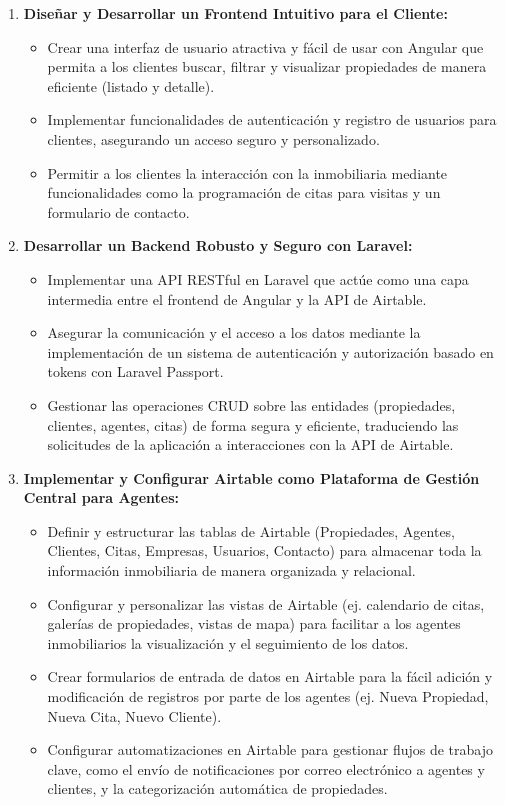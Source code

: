 \begin{enumerate}
    \item \textbf{Diseñar y Desarrollar un Frontend Intuitivo para el Cliente:}
    \begin{itemize}
        \item Crear una interfaz de usuario atractiva y fácil de usar con Angular que permita a los clientes buscar, filtrar y visualizar propiedades de manera eficiente (listado y detalle).
        \item Implementar funcionalidades de autenticación y registro de usuarios para clientes, asegurando un acceso seguro y personalizado.
        \item Permitir a los clientes la interacción con la inmobiliaria mediante funcionalidades como la programación de citas para visitas y un formulario de contacto.
    \end{itemize}

    \item \textbf{Desarrollar un Backend Robusto y Seguro con Laravel:}
    \begin{itemize}
        \item Implementar una API RESTful en Laravel que actúe como una capa intermedia entre el frontend de Angular y la API de Airtable.
        \item Asegurar la comunicación y el acceso a los datos mediante la implementación de un sistema de autenticación y autorización basado en tokens con Laravel Passport.
        \item Gestionar las operaciones CRUD sobre las entidades (propiedades, clientes, agentes, citas) de forma segura y eficiente, traduciendo las solicitudes de la aplicación a interacciones con la API de Airtable.
    \end{itemize}

    \item \textbf{Implementar y Configurar Airtable como Plataforma de Gestión Central para Agentes:}
    \begin{itemize}
        \item Definir y estructurar las tablas de Airtable (Propiedades, Agentes, Clientes, Citas, Empresas, Usuarios, Contacto) para almacenar toda la información inmobiliaria de manera organizada y relacional.
        \item Configurar y personalizar las vistas de Airtable (ej. calendario de citas, galerías de propiedades, vistas de mapa) para facilitar a los agentes inmobiliarios la visualización y el seguimiento de los datos.
        \item Crear formularios de entrada de datos en Airtable para la fácil adición y modificación de registros por parte de los agentes (ej. Nueva Propiedad, Nueva Cita, Nuevo Cliente).
        \item Configurar automatizaciones en Airtable para gestionar flujos de trabajo clave, como el envío de notificaciones por correo electrónico a agentes y clientes, y la categorización automática de propiedades.
    \end{itemize}


\end{enumerate}
